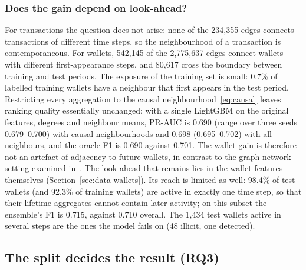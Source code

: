 \subsubsection{Does the gain depend on look-ahead?} For transactions the question does not arise: none of the 234,355 edges connects transactions of different time steps, so the neighbourhood of a transaction is contemporaneous. For wallets, 542,145 of the 2,775,637 edges connect wallets with different first-appearance steps, and 80,617 cross the boundary between training and test periods. The exposure of the training set is small: 0.7\% of labelled training wallets have a neighbour that first appears in the test period. Restricting every aggregation to the causal neighbourhood~\eqref{eq:causal} leaves ranking quality essentially unchanged: with a single LightGBM on the original features, degrees and neighbour means, PR-AUC is 0.690 (range over three seeds 0.679--0.700) with causal neighbourhoods and 0.698 (0.695--0.702) with all neighbours, and the oracle F1 is 0.690 against 0.701.
The wallet gain is therefore not an artefact of adjacency to future wallets, in contrast to the graph-network setting examined in~\cite{maganti2026}. The look-ahead that remains lies in the wallet features themselves (Section~\ref{sec:data-wallets}). Its reach is limited as well: 98.4\% of test wallets (and 92.3\% of training wallets) are active in exactly one time step, so that their lifetime aggregates cannot contain later activity; on this subset the ensemble's F1 is 0.715, against 0.710 overall. The 1,434 test wallets active in several steps are the ones the model fails on (48 illicit, one detected).

\subsection{The split decides the result (RQ3)}\label{sec:res-split}

